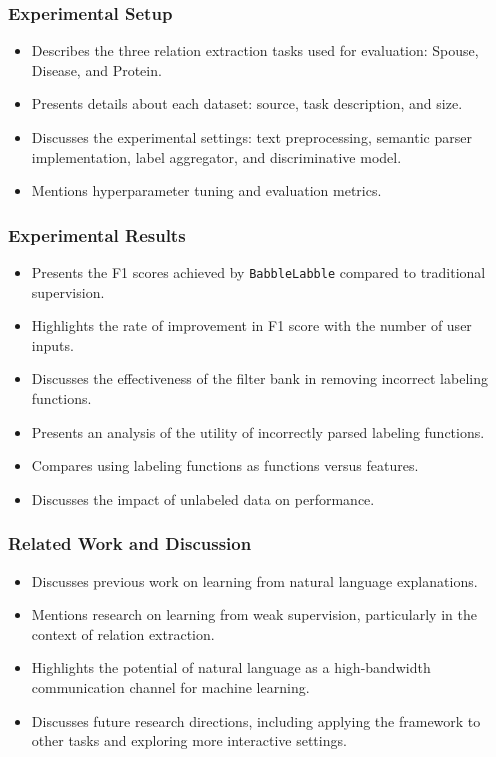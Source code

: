 \documentclass[
  letterpaper,
  DIV=11,
  numbers=noendperiod,
  oneside]{scrartcl}
\providecommand{\tightlist}{%
  \setlength{\itemsep}{0pt}\setlength{\parskip}{0pt}}
\begin{document}
\subsubsection{Experimental Setup}\label{experimental-setup}

\begin{itemize}
\tightlist
\item
  Describes the three relation extraction tasks used for evaluation:
  Spouse, Disease, and Protein.
\item
  Presents details about each dataset: source, task description, and
  size.
\item
  Discusses the experimental settings: text preprocessing, semantic
  parser implementation, label aggregator, and discriminative model.
\item
  Mentions hyperparameter tuning and evaluation metrics.
\end{itemize}

\subsubsection{Experimental Results}\label{experimental-results}

\begin{itemize}
\tightlist
\item
  Presents the F1 scores achieved by \texttt{BabbleLabble} compared to
  traditional supervision.
\item
  Highlights the rate of improvement in F1 score with the number of user
  inputs.
\item
  Discusses the effectiveness of the filter bank in removing incorrect
  labeling functions.
\item
  Presents an analysis of the utility of incorrectly parsed labeling
  functions.
\item
  Compares using labeling functions as functions versus features.
\item
  Discusses the impact of unlabeled data on performance.
\end{itemize}

\subsubsection{Related Work and
Discussion}\label{related-work-and-discussion}

\begin{itemize}
\tightlist
\item
  Discusses previous work on learning from natural language
  explanations.
\item
  Mentions research on learning from weak supervision, particularly in
  the context of relation extraction.
\item
  Highlights the potential of natural language as a high-bandwidth
  communication channel for machine learning.
\item
  Discusses future research directions, including applying the framework
  to other tasks and exploring more interactive settings.
\end{itemize}
\end{document}
